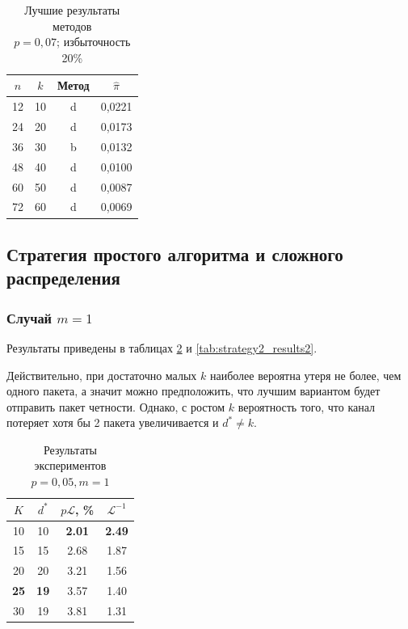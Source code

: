 \begin{table}
\begin{center}
    \begin{tabular}{|c|c|c|c|}
        \hline
        $n$ & $k$ & Метод & $\hat\pi$ \\
        \hline
        12 & 10 & d & 0{,}0221 \\
        \hline
        24 & 20 & d & 0{,}0173 \\
        \hline
        36 & 30 & b & 0{,}0132 \\
        \hline
        48 & 40 & d & 0{,}0100 \\
        \hline
        60 & 50 & d & 0{,}0087 \\
        \hline
        72 & 60 & d & 0{,}0069 \\
        \hline
    \end{tabular}
    \caption{Лучшие результаты методов\\ $p=0{,}07$; избыточность 20\%}
    \label{tab:fountaincodes_results_2}
\end{center}
\end{table}

\subsection{Стратегия простого алгоритма и сложного распределения}

\subsubsection{Случай $m=1$}

Результаты приведены в таблицах \ref{tab:strategy2_results1} и
\ref{tab:strategy2_results2}.

Действительно, при достаточно малых $k$ наиболее вероятна утеря не более, чем одного пакета, 
а значит
можно предположить, что лучшим вариантом будет отправить пакет четности. Однако, с ростом $k$ вероятность того, что 
канал потеряет хотя бы 2 пакета увеличивается и $d^*\ne k$.  

\begin{table}[h!]
\begin{center}
    \begin{tabular}{|c|c|c|c|}
        \hline
        $K$ & $d^*$ & $p \mathcal L$, \% & $\mathcal L^{-1}$ \\
        \hline
        10 & 10 & \textbf{2.01} & \textbf{2.49} \\
        \hline
        15 & 15 & 2.68 & 1.87 \\
        \hline
        20 & 20 & 3.21 & 1.56 \\ 
        \hline
        \textbf{25} & \textbf{19} & 3.57 & 1.40 \\ 
        \hline
        30 & 19 & 3.81 & 1.31 \\
        \hline
    \end{tabular}
    \caption{Результаты экспериментов\\$p=0{,}05, m=1$}
    \label{tab:strategy2_results1}
\end{center}
\end{table}

